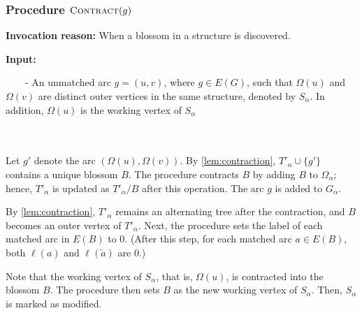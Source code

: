 \documentclass{article}
\newcommand{\alp}{\alpha}
\newcommand{\Omg}{\Omega}
\newcommand{\algContract}{\textsc{Contract}\xspace}
\newcommand\cev[1]{\overleftarrow{#1}}
\newcommand{\mytab}{\ \ \ \ }
\begin{document}
\subsubsection{Procedure $\algContract(g)$}
\label{sec:contract}
\begin{minipage}{0.95\linewidth}
    \begin{mdframed}[backgroundcolor=gray!15, linecolor=red!40!black]
    \textbf{Invocation reason:} When a blossom in a structure is discovered.
    
    \textbf{Input:} 

    \mytab - An unmatched arc $g = (u, v)$, where $g \in E(G)$, such that $\Omg(u)$ and $\Omg(v)$ are distinct outer vertices in the same structure, denoted by $S_\alp$. In addition, $\Omg(u)$ is the working vertex of $S_\alp$

    \end{mdframed}
\end{minipage}
\\\\
Let $g'$ denote the arc $(\Omg(u), \Omg(v))$.
By \cref{lem:contraction}, $T'_\alp \cup \{g'\}$ contains a unique blossom $B$.
The procedure contracts $B$ by adding $B$ to $\Omg_\alp$; hence, $T'_\alp$ is updated as $T'_\alp / B$ after this operation.
The arc $g$ is added to $G_\alp$.

By \cref{lem:contraction}, $T'_\alp$ remains an alternating tree after the contraction, and $B$ becomes an outer vertex of $T'_\alp$.
Next, the procedure sets the label of each matched arc in $E(B)$ to $0$.
(After this step, for each matched arc $a \in E(B)$, both $\ell(a)$ and $\ell(\cev{a})$ are $0$.)

Note that the working vertex of $S_\alp$, that is, $\Omg(u)$, is contracted into the blossom $B$.
The procedure then sets $B$ as the new working vertex of $S_\alp$.
Then, $S_\alp$ is marked as modified.
\end{document}

